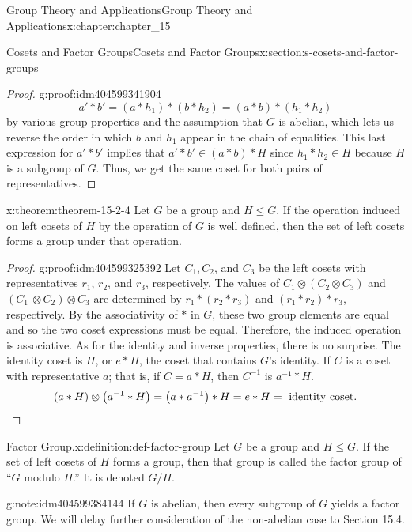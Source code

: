 \documentclass[twoside,10pt,]{book}
\newcommand{\qedhere}{\relax}
\numberwithin{equation}{section}
\begin{document}
\begin{chapterptx}{Group Theory and Applications}{}{Group Theory and Applications}{}{}{x:chapter:chapter_15}
\begin{sectionptx}{Cosets and Factor Groups}{}{Cosets and Factor Groups}{}{}{x:section:s-cosets-and-factor-groups}
\begin{proof}{}{g:proof:idm404599341904}
\begin{equation*}
a'*b' = (a*h_1)*(b*h_2) = (a*b)*(h_1*h_2)
\end{equation*}
by various group properties and the assumption that \(G\) is abelian, which lets us reverse the order in which \(b\) and \(h_1\) appear in the chain of equalities.  This last expression for \(a'*b'\) implies that \(a'*b' \in  (a*b)*H\) since \(h_1*h_2 \in  H\) because \(H\) is a subgroup of \(G\).  Thus, we get the same coset for both pairs of representatives.%
\end{proof}
\begin{theorem}{}{}{x:theorem:theorem-15-2-4}%
Let \(G\) be a group and \(H \leq  G\). If the operation induced on left cosets of \(H\) by the operation of \(G\) is well defined, then the set of left cosets forms a group under that operation.%
\end{theorem}
\begin{proof}{}{g:proof:idm404599325392}
Let \(C_1\)\(,C_2\), and \(C_3\) be the left cosets with representatives \(r_1\), \(r_2\), and \(r_3\), respectively.   The values of \(C_1 \otimes  \left(C_2 \otimes C_3\right)\) and \(\left(C_1\ \otimes  C_2\right)\otimes  C_3\) are determined by   \(r_1 * \left(r_2 * r_3\right)\) and \(\left(r_1 * r_2\right) * r_3\), respectively. By the associativity of \(*\) in \(G\), these two group elements are equal and so  the two coset expressions must be equal. Therefore, the induced operation is associative. As for the identity and inverse properties, there is no surprise. The identity coset is \(H\), or \(e*H\), the coset that contains \(G\)'s identity. If \(C\) is a coset with representative \(a\); that is, if  \(C = a*H\), then \(C^{-1}\) is \(a^{-1}*H\).%
\begin{equation*}
(a*H)\otimes  \left(a^{-1}*H\right) = \left(a*a^{-1}\right)*H = e*H = \textrm{ identity} \textrm{ coset}\text{.}\qedhere
\end{equation*}
%
\end{proof}
\begin{definition}{Factor Group.}{x:definition:def-factor-group}%
%
\label{g:notation:idm404599324656}%
Let \(G\) be a group and \(H \leq  G\). If the set of left cosets of \(H\) forms a group, then that group is called the factor group of ``\(G\) modulo \(H\).''   It is denoted \(G/H\).%
\end{definition}
\begin{note}{}{g:note:idm404599384144}%
If \(G\) is abelian, then every subgroup of \(G\) yields a factor group. We will delay further consideration of the non-abelian case to Section 15.4.%

\end{note}
\end{sectionptx}
\end{chapterptx}
\end{document}

